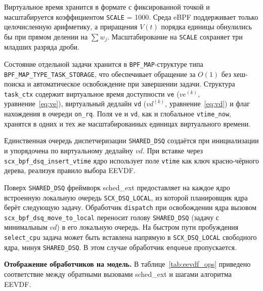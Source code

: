 \documentclass[14pt, oneside]{extbook}
\begin{document}
        Виртуальное время хранится в формате с фиксированной
        точкой и масштабируется коэффициентом \texttt{SCALE} = 1000.
        Среда eBPF поддерживает только целочисленную
        арифметику, а приращения $V(t)$ порядка единицы
        обнулились бы при прямом делении на $\sum w_j$.
        Масштабирование на \texttt{SCALE} сохраняет три
        младших разряда дроби.

        \begin{sloppypar}
        Состояние отдельной задачи хранится в
        \texttt{BPF\_MAP}-структуре типа
        \texttt{BPF\_MAP\_TYPE\_\allowbreak TASK\_STORAGE},
        что обеспечивает
        обращение за $O(1)$ без хеш-поиска и автоматическое
        освобождение при завершении задачи. Структура
        \texttt{task\_ctx} содержит виртуальное время доступности
        \texttt{ve} ($ve^{(k)}$, уравнение~\eqref{eq:ve}),
        виртуальный дедлайн \texttt{vd} ($vd^{(k)}$,
        уравнение~\eqref{eq:vd}) и флаг нахождения в очереди
        \texttt{on\_rq}. Поля \texttt{ve} и \texttt{vd}, как и
        глобальное \texttt{vtime\_now}, хранятся в одних и тех же
        масштабированных единицах виртуального времени.
        \end{sloppypar}

        Единственная очередь диспетчеризации
        \texttt{SHARED\_DSQ} создаётся при инициализации и
        упорядочена по виртуальному дедлайну $vd$. При вставке
        через \texttt{scx\_bpf\_dsq\_insert\_vtime} ядро
        использует поле \texttt{vtime} как ключ красно-чёрного
        дерева, реализуя правило выбора EEVDF.

        Поверх \texttt{SHARED\_DSQ} фреймворк sched\_ext
        предоставляет на каждое ядро встроенную локальную
        очередь \texttt{SCX\_DSQ\_LOCAL}, из которой
        планировщик ядра берёт следующую задачу.
        Обработчик \texttt{dispatch} при освобождении ядра
        вызовом \texttt{scx\_bpf\_dsq\_move\_to\_local}
        переносит голову \texttt{SHARED\_DSQ} (задачу с
        минимальным $vd$) в его локальную очередь. На быстром
        пути пробуждения \texttt{select\_cpu} задача может быть
        вставлена напрямую в \texttt{SCX\_DSQ\_LOCAL} свободного
        ядра, минуя \texttt{SHARED\_DSQ}. В этом случае
        обработчик \texttt{enqueue} пропускается.

        \textbf{Отображение обработчиков на модель.}
        В таблице~\ref{tab:eevdf_ops} приведено соответствие
        между обратными вызовами sched\_ext и шагами
        алгоритма EEVDF.
\end{document}
